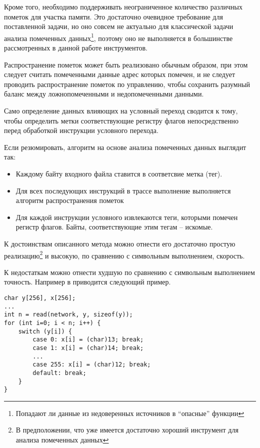 Кроме того, необходимо поддерживать неограниченное количество различных пометок для участка памяти. Это достаточно очевидное требование для поставленной задачи, но оно совсем не актуально для классической задачи анализа помеченных данных\footnote{Попадают ли данные из недоверенных источников в ``опасные'' функции}, поэтому оно не выполняется в большинстве рассмотренных в данной работе инструментов.

Распространение пометок может быть реализовано обычным образом, при этом следует считать помеченными данные адрес которых помечен, и не следует проводить распространение пометок по управлению, чтобы сохранить разумный баланс между ложнопомеченными и недопомеченными данными.

Само определение данных влияющих на условный переход сводится к тому, чтобы определить метки соответствующие регистру флагов непосредственно перед обработкой инструкции условного перехода.

Если резюмировать, алгоритм на основе анализа помеченных данных выглядит так:

\begin{itemize}
  \item Каждому байту входного файла ставится в соответсвие метка (тег).
  \item Для всех последующих инструкций в трассе выполнение выполняется алгоритм распространения пометок
  \item Для каждой инструкции условного извлекаются теги, которыми помечен регистр флагов. Байты, соответствующие этим тегам -- искомые.
\end{itemize}

К достоинствам описанного метода можно отнести его достаточно простую реализацию\footnote{В предположении, что уже имеется достаточно хороший инструмент для анализа помеченных данных} и высокую, по сравнению с символьным выполнением, скорость.

К недостаткам можно отнести худшую по сравнению с символьным выполнением точность. Например в \cite{Cavallaro07anti-taint-analysis:practical} приводится следующий пример.

\begin{lstlisting}[environoment=C_LANG,captionpos=b]
char y[256], x[256];
...
int n = read(network, y, sizeof(y));
for (int i=0; i < n; i++) {
    switch (y[i]) {
        case 0: x[i] = (char)13; break;
        case 1: x[i] = (char)14; break;
        ...
        case 255: x[i] = (char)12; break;
        default: break;
    }
}
\end{lstlisting}

